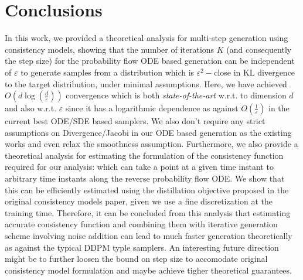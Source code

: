 \documentclass[11pt]{article}
\begin{document}
\section{Conclusions}
\noindent
In this work, we provided a theoretical analysis for multi-step generation using consistency models, showing that the number of iterations $K$ (and consequently the step size) for the probability flow ODE based generation  can be independent of $\varepsilon$ to generate samples from a distribution which is $\varepsilon^2-$close in KL divergence to the target distribution, under minimal assumptions. Here, we have achieved $O(d\log(\frac{d}{\varepsilon}))$ convergence which is both \textit{state-of-the-art} w.r.t. to dimension $d$ and also w.r.t. $\varepsilon$ since it has a logarithmic dependence as against $O(\frac{1}{\varepsilon})$ in the current best ODE/SDE based samplers. We also don't require any strict assumptions on Divergence/Jacobi in our ODE based generation as the existing works and even relax the smoothness assumption. 
Furthermore, we also provide a theoretical analysis for estimating the formulation of the consistency function required for our analysis: which can take a point at a given time instant to arbitrary time instants along the reverse probability flow ODE. We show that this can be efficiently estimated using the distillation objective proposed in the original consistency models paper, given we use a fine discretization at the training time. Therefore, it can be concluded from this analysis that estimating accurate consistency function and combining them with iterative generation scheme involving noise addition can lead to much faster generation theoretically as against the typical DDPM typle samplers. An interesting future direction might be to further loosen the bound on step size to accomodate original consistency model formulation and maybe achieve tigher theoretical guarantees.







\end{document}
